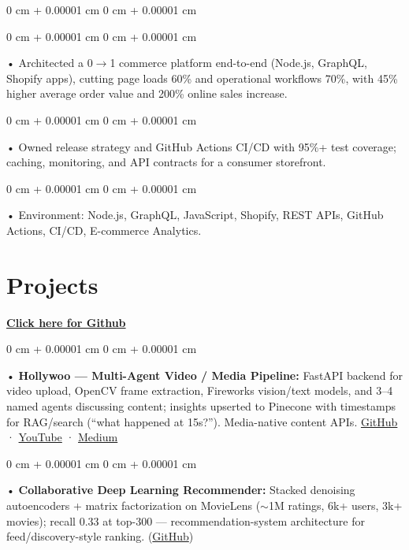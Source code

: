 \documentclass[10pt, letterpaper]{article}
\newenvironment{onecolentry}{
    \begin{adjustwidth}{
        0 cm + 0.00001 cm
    }{
        0 cm + 0.00001 cm
    }
}{
    \end{adjustwidth}
} %
\begin{document}
\begin{onecolentry}
        \begin{onecolentry}
             • Architected a 0$\rightarrow$1 commerce platform end-to-end (Node.js, GraphQL, Shopify apps), cutting page loads 60\% and operational workflows 70\%, with 45\% higher average order value and 200\% online sales increase.
        \end{onecolentry}
        \begin{onecolentry}
             • Owned release strategy and GitHub Actions CI/CD with 95\%+ test coverage; caching, monitoring, and API contracts for a consumer storefront.
        \end{onecolentry}

        \begin{onecolentry}
             • Environment: Node.js, GraphQL, JavaScript, Shopify, REST APIs, GitHub Actions, CI/CD, E-commerce Analytics.
        \end{onecolentry}
             \vspace{2 pt }

        \vspace{0.4cm}
\section{Projects}
    \vspace{2 pt}
\end{onecolentry}
\textbf{\href{https://github.com/daedalus-s}{Click here for Github}}
\begin{onecolentry}
     • \textbf{Hollywoo --- Multi-Agent Video / Media Pipeline:} FastAPI backend for video upload, OpenCV frame extraction, Fireworks vision/text models, and 3--4 named agents discussing content; insights upserted to Pinecone with timestamps for RAG/search (``what happened at 15s?''). Media-native content APIs. \href{https://github.com/daedalus-s/fireworks-video-discussion}{GitHub} · \href{https://www.youtube.com/watch?v=KBs_3V0OAgU}{YouTube} · \href{https://medium.com/@sreenikethaathreya/hollywoo-ai-video-analysis-5eae37ca7e16}{Medium}
\end{onecolentry}
\begin{onecolentry}
     • \textbf{Collaborative Deep Learning Recommender:} Stacked denoising autoencoders + matrix factorization on MovieLens ($\sim$1M ratings, 6k+ users, 3k+ movies); recall 0.33 at top-300 --- recommendation-system architecture for feed/discovery-style ranking. (\href{https://github.com/daedalus-s/MovieRecommendationCDL}{GitHub})
\end{onecolentry}
\end{document}
